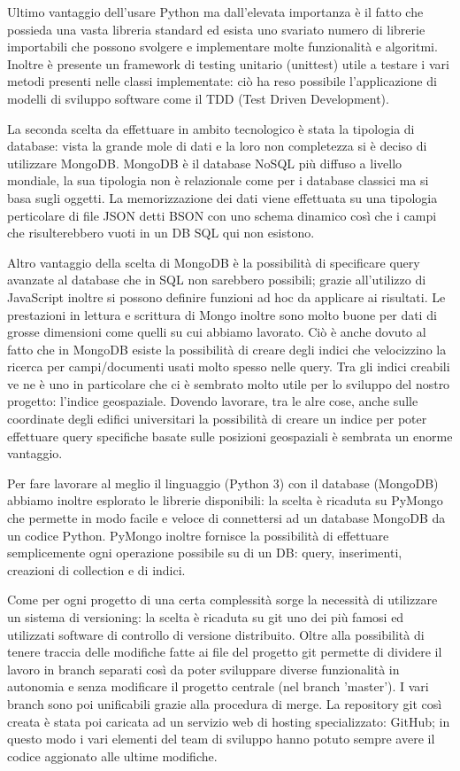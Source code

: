 \documentclass[12pt]{report}
\begin{document}
Ultimo vantaggio dell'usare Python ma dall'elevata importanza è il fatto che possieda una vasta libreria standard ed esista uno svariato numero di librerie importabili che possono svolgere e implementare molte funzionalità e algoritmi. Inoltre è presente un framework di testing unitario (unittest) utile a testare i vari metodi presenti nelle classi implementate: ciò ha reso possibile l'applicazione di modelli di sviluppo software come il TDD (Test Driven Development).

La seconda scelta da effettuare in ambito tecnologico è stata la tipologia di database: vista la grande mole di dati e la loro non completezza si è deciso di utilizzare MongoDB. MongoDB è il database NoSQL più diffuso a livello mondiale, la sua tipologia non è relazionale come per i database classici ma si basa sugli oggetti. La memorizzazione dei dati viene effettuata su una tipologia perticolare di file JSON detti BSON con uno schema dinamico così che i campi che risulterebbero vuoti in un DB SQL qui non esistono. 

Altro vantaggio della scelta di MongoDB è la possibilità di specificare query avanzate al database che in SQL non sarebbero possibili; grazie all'utilizzo di JavaScript inoltre si possono definire funzioni ad hoc da applicare ai risultati. Le prestazioni in lettura e scrittura di Mongo inoltre sono molto buone per dati di grosse dimensioni come quelli su cui abbiamo lavorato. Ciò è anche dovuto al fatto che in MongoDB esiste la possibilità di creare degli indici che velocizzino la ricerca per campi/documenti usati molto spesso nelle query. Tra gli indici creabili ve ne è uno in particolare che ci è sembrato molto utile per lo sviluppo del nostro progetto: l'indice geospaziale. Dovendo lavorare, tra le alre cose, anche sulle coordinate degli edifici universitari la possibilità di creare un indice per poter effettuare query specifiche basate sulle posizioni geospaziali è sembrata un enorme vantaggio.

Per fare lavorare al meglio il linguaggio (Python 3) con il database (MongoDB) abbiamo inoltre esplorato le librerie disponibili: la scelta è ricaduta su PyMongo che permette in modo facile e veloce di connettersi ad un database MongoDB da un codice Python. PyMongo inoltre fornisce la possibilità di effettuare semplicemente ogni operazione possibile su di un DB: query, inserimenti, creazioni di collection e di indici. 
 
Come per ogni progetto di una certa complessità sorge la necessità di utilizzare un sistema di versioning: la scelta è ricaduta su git uno dei più famosi ed utilizzati software di controllo di versione distribuito. Oltre alla possibilità di tenere traccia delle modifiche fatte ai file del progetto git permette di dividere il lavoro in branch separati così da poter sviluppare diverse funzionalità in autonomia e senza modificare il progetto centrale (nel branch 'master'). I vari branch sono poi unificabili grazie alla procedura di merge. La repository git così creata è stata poi caricata ad un servizio web di hosting specializzato: GitHub; in questo modo i vari elementi del team di sviluppo hanno potuto sempre avere il codice aggionato alle ultime modifiche.
\end{document}
